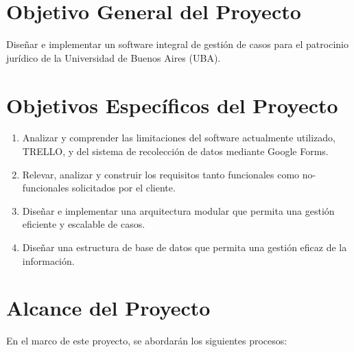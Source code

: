 \section {Objetivo General del Proyecto}
\label{sec:objetivos:generales}
Diseñar e implementar un software integral de gestión de casos para el patrocinio jurídico de la Universidad de Buenos Aires (UBA).

\section {Objetivos Específicos del Proyecto}
\label{sec:objetivos:especificos}

\begin {enumerate}
\item Analizar y comprender las limitaciones del software actualmente utilizado, TRELLO, y del sistema de recolección de datos mediante Google Forms.
\item Relevar, analizar y construir los requisitos tanto funcionales como no-funcionales solicitados por el cliente.
\item Diseñar e implementar una arquitectura modular que permita una gestión eficiente y escalable de casos.
\item Diseñar una estructura de base de datos que permita una gestión eficaz de la información.
\end{enumerate}

\section {Alcance del Proyecto}
\label{sec:alcance}
En el marco de este proyecto, se abordarán los siguientes procesos:

